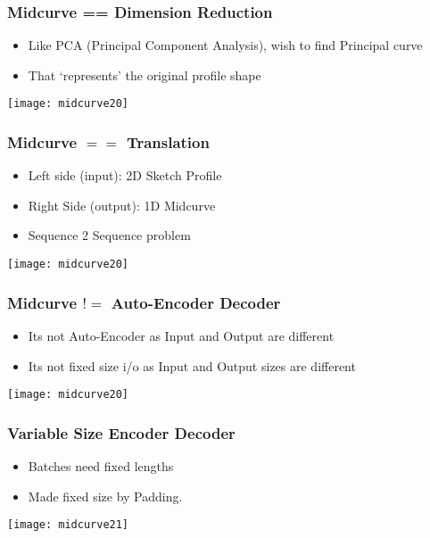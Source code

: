 \begin{frame}[fragile]\frametitle{Midcurve == Dimension Reduction}

	\begin{itemize}
	\item Like PCA (Principal Component Analysis), wish to find Principal curve
	\item That `represents' the original profile shape
	\end{itemize}
\begin{center}
\texttt{[image: midcurve20]}
\end{center}	
\end{frame}

\begin{frame}[fragile]\frametitle{Midcurve $==$ Translation}

	\begin{itemize}
	\item Left side (input): 2D Sketch Profile
	\item Right Side (output): 1D Midcurve
	\item Sequence 2 Sequence problem
	\end{itemize}
\begin{center}
\texttt{[image: midcurve20]}
\end{center}	
\end{frame}

\begin{frame}[fragile]\frametitle{Midcurve $!=$ Auto-Encoder Decoder}

	\begin{itemize}
	\item Its not Auto-Encoder as Input and Output are different
	\item Its not fixed size i/o as Input and Output sizes are different
	\end{itemize}
\begin{center}
\texttt{[image: midcurve20]}
\end{center}	
\end{frame}

\begin{frame}[fragile]\frametitle{Variable Size Encoder Decoder}

	\begin{itemize}
	\item Batches need fixed lengths
	\item Made fixed size by Padding.
	\end{itemize}
\begin{center}
\texttt{[image: midcurve21]}
\end{center}	
\end{frame}


